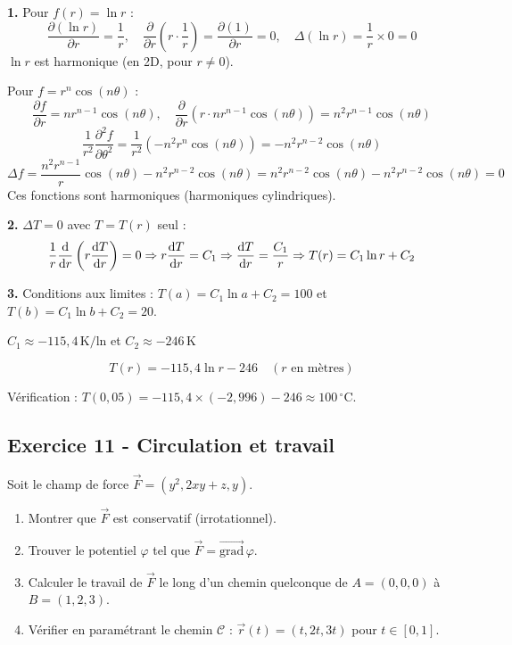 \documentclass[12pt,a4paper]{article}
\begin{document}
\begin{boitecorrige}
\textbf{1.} Pour $f(r) = \ln r$ :
\[
\frac{\partial(\ln r)}{\partial r} = \frac{1}{r}, \quad \frac{\partial}{\partial r}\left(r\cdot\frac{1}{r}\right) = \frac{\partial(1)}{\partial r} = 0, \quad \Delta(\ln r) = \frac{1}{r}\times0 = 0
\]
$\ln r$ est harmonique (en 2D, pour $r\neq0$).

Pour $f = r^n\cos(n\theta)$ :
\[
\frac{\partial f}{\partial r} = nr^{n-1}\cos(n\theta), \quad \frac{\partial}{\partial r}(r\cdot nr^{n-1}\cos(n\theta)) = n^2r^{n-1}\cos(n\theta)
\]
\[
\frac{1}{r^2}\frac{\partial^2 f}{\partial\theta^2} = \frac{1}{r^2}(-n^2 r^n\cos(n\theta)) = -n^2r^{n-2}\cos(n\theta)
\]
\[
\Delta f = \frac{n^2r^{n-1}}{r}\cos(n\theta) - n^2 r^{n-2}\cos(n\theta) = n^2r^{n-2}\cos(n\theta) - n^2r^{n-2}\cos(n\theta) = 0
\]
Ces fonctions sont harmoniques (harmoniques cylindriques).

\textbf{2.} $\Delta T = 0$ avec $T = T(r)$ seul :
\[
\frac{1}{r}\frac{\mathrm{d}}{\mathrm{d} r}\left(r\frac{\mathrm{d} T}{\mathrm{d} r}\right) = 0 \Rightarrow r\frac{\mathrm{d} T}{\mathrm{d} r} = C_1 \Rightarrow \frac{\mathrm{d} T}{\mathrm{d} r} = \frac{C_1}{r} \Rightarrow T(r) = C_1\ln r + C_2
\]

\textbf{3.} Conditions aux limites : $T(a) = C_1\ln a + C_2 = 100$ et $T(b) = C_1\ln b + C_2 = 20$.

$C_1 \approx -115{,}4\,\mathrm{K/ln}$ et $C_2 \approx -246\,\mathrm{K}$

\[
T(r) = -115{,}4\ln r - 246 \quad (r\text{ en mètres})
\]

Vérification : $T(0{,}05) = -115{,}4\times(-2{,}996)-246 \approx 100\,^\circ\text{C}$.
\end{boitecorrige}

\subsection*{Exercice 11 - Circulation et travail \niveau{\moyen}}

\begin{boiteexercice}
Soit le champ de force $\vec{F} = (y^2, 2xy+z, y)$.
\begin{enumerate}
  \item Montrer que $\vec{F}$ est conservatif (irrotationnel).
  \item Trouver le potentiel $\varphi$ tel que $\vec{F} = \overrightarrow{\text{grad}}\,\varphi$.
  \item Calculer le travail de $\vec{F}$ le long d'un chemin quelconque de $A=(0,0,0)$ à $B=(1,2,3)$.
  \item Vérifier en paramétrant le chemin $\mathcal{C}$ : $\vec{r}(t) = (t, 2t, 3t)$ pour $t\in[0,1]$.
\end{enumerate}
\end{boiteexercice}
\end{document}
